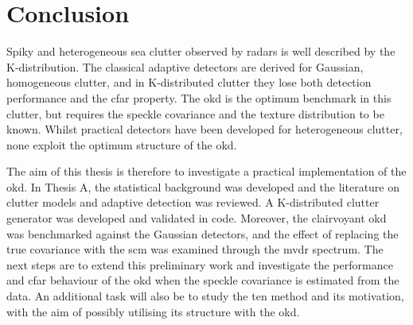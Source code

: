 \documentclass[12pt, a4paper]{report}
\begin{document}
\chapter{Conclusion}
\label{ch:conclusion}
Spiky and heterogeneous sea clutter observed by radars is well described by the K-distribution. The classical adaptive detectors are derived for Gaussian, homogeneous clutter, and in K-distributed clutter they lose both detection performance and the \gls{cfar} property. The \gls{okd} is the optimum benchmark in this clutter, but requires the speckle covariance and the texture distribution to be known. Whilst practical detectors have been developed for heterogeneous clutter, none exploit the optimum structure of the \gls{okd}.

The aim of this thesis is therefore to investigate a practical implementation of the \gls{okd}. In Thesis A, the statistical background was developed and the literature on clutter models and adaptive detection was reviewed. A K-distributed clutter generator was developed and validated in code. Moreover, the clairvoyant \gls{okd} was benchmarked against the Gaussian detectors, and the effect of replacing the true covariance with the \gls{scm} was examined through the \gls{mvdr} spectrum. The next steps are to extend this preliminary work and investigate the performance and \gls{cfar} behaviour of the \gls{okd} when the speckle covariance is estimated from the data. An additional task will also be to study the \gls{ten} method and its motivation, with the aim of possibly utilising its structure with the \gls{okd}.





\end{document}

